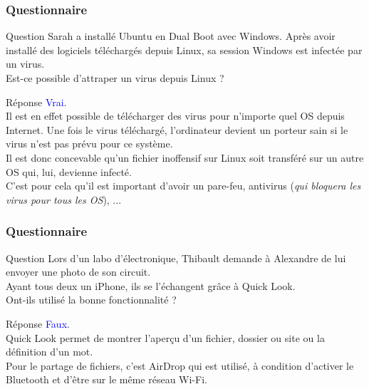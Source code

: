 \documentclass[aspectratio=169]{beamer}
\begin{document}
\begin{frame}
  \frametitle{Questionnaire}
  \begin{exampleblock}{Question}
    Sarah a installé Ubuntu en Dual Boot avec Windows. Après avoir installé des
    logiciels téléchargés depuis Linux, sa session Windows est infectée par un
    virus. \\
    Est-ce possible d’attraper un virus depuis Linux ?
  \end{exampleblock}

  \pause

  \begin{block}{Réponse}
    \textcolor{blue}{Vrai}. \\
    Il est en effet possible de télécharger des virus pour n'importe quel OS
    depuis Internet. Une fois le virus téléchargé, l'ordinateur devient un
    porteur sain si le virus n'est pas prévu pour ce système. \\
    Il est donc concevable qu'un fichier inoffensif sur Linux soit transféré sur
    un autre OS qui, lui, devienne infecté. \\
    C'est pour cela qu'il est important d'avoir un pare-feu, antivirus
    (\textit{qui bloquera les virus pour tous les OS}), ...
  \end{block}
\end{frame}

\begin{frame}
  \frametitle{Questionnaire}
  \begin{exampleblock}{Question}
    Lors d’un labo d’électronique, Thibault demande à Alexandre de lui envoyer
    une photo de son circuit. \\
    Ayant tous deux un iPhone, ils se l’échangent grâce à Quick Look. \\
    Ont-ils utilisé la bonne fonctionnalité ?
  \end{exampleblock}

  \pause

  \begin{block}{Réponse}
    \textcolor{blue}{Faux}. \\
    Quick Look permet de montrer l’aperçu d’un fichier, dossier ou site ou la
    définition d’un mot. \\
    Pour le partage de fichiers, c’est AirDrop qui est utilisé, à condition
    d’activer le Bluetooth et d’être sur le même réseau Wi-Fi.
  \end{block}
\end{frame}
\end{document}
